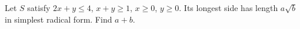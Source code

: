 Let $S$ satisfy $2x+y\le 4$, $x+y\ge 1$, $x\ge 0$, $y\ge 0$. Its longest side has length $a\sqrt b$ in simplest radical form. Find $a+b$.

